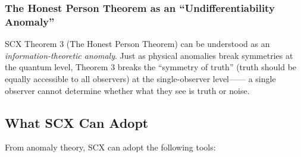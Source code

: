 \documentclass[12pt,a4paper]{article}
\theoremstyle{remark}
\begin{document}
\subsubsection{The Honest Person Theorem as an ``Undifferentiability Anomaly''}

SCX Theorem 3 (The Honest Person Theorem) can be understood as an
\textit{information-theoretic anomaly}. Just as physical anomalies break symmetries at the
quantum level, Theorem 3 breaks the ``symmetry of truth'' (truth should be equally
accessible to all observers) at the single-observer level——
a single observer cannot determine whether what they see is truth or noise.

\subsection{What SCX Can Adopt}

From anomaly theory, SCX can adopt the following tools:
\end{document}
